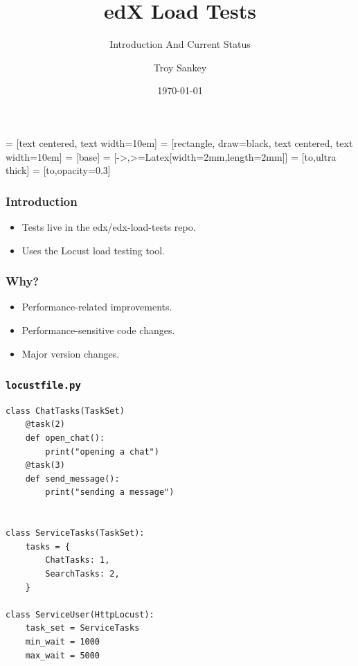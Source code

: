 \documentclass{beamer}
\title{edX Load Tests}
\subtitle{Introduction And Current Status}
\author{Troy Sankey}
\date{\today}
\begin{document}
 = [text centered, text width=10em]
 = [rectangle, draw=black, text centered, text width=10em]
 = [base]
 = [->,>={Latex[width=2mm,length=2mm]}]
 = [to,ultra thick]
 = [to,opacity=0.3]

\begin{frame}
\titlepage
\end{frame}

\begin{frame}
\frametitle{Introduction}
\begin{itemize}
\item Tests live in the edx/edx-load-tests repo.\pause
\item Uses the Locust load testing tool.
\end{itemize}
\end{frame}


\begin{frame}
\frametitle{Why?}
\begin{itemize}
\item Performance-related improvements.\pause
\item Performance-sensitive code changes.
\item Major version changes.
\end{itemize}
\end{frame}


\newcommand{\highlight}[1]{%
  \begingroup
  \setlength{\fboxsep}{0pt}%
  \colorbox{yellow}{\strut#1}%
  \endgroup
}


\begin{frame}[fragile]
\frametitle{\texttt{locustfile.py}}
\begin{verbatim}
class ChatTasks(TaskSet)
    @task(2)
    def open_chat():
        print("opening a chat")
    @task(3)
    def send_message():
        print("sending a message")


class ServiceTasks(TaskSet):
    tasks = {
        ChatTasks: 1,
        SearchTasks: 2,
    }

class ServiceUser(HttpLocust):
    task_set = ServiceTasks
    min_wait = 1000
    max_wait = 5000
\end{verbatim}
\end{frame}
\end{document}
